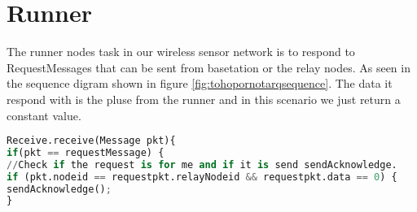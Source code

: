 \section{Runner}\label{sc:runner}
The runner nodes task in our wireless sensor network is to respond to RequestMessages that can be sent from basetation or the relay nodes. As seen in the sequence digram shown in figure \ref{fig:tohopornotarqsequence}. The data it respond with is the pluse from the runner and in this scenario we just return a constant value.

\begin{lstlisting}[language=Python]
Receive.receive(Message pkt){
if(pkt == requestMessage) {
//Check if the request is for me and if it is send sendAcknowledge.
if (pkt.nodeid == requestpkt.relayNodeid && requestpkt.data == 0) {
sendAcknowledge();
}
\end{lstlisting}